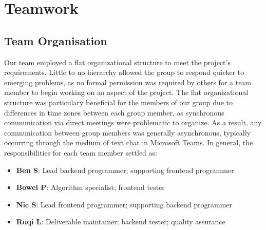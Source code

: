 \documentclass{article}
\begin{document}
\section{Teamwork}
\subsection{Team Organisation}
Our team employed a flat organizational structure to meet the project's
requirements. Little to no hierarchy allowed the group to respond quicker
to emerging problems, as no formal permission was required by others for
a team member to begin working on an aspect of the project. The flat
organizational structure was particulary beneficial for the members of our
group due to differences in time zones between each group member, as
synchronous communication via direct meetings were problematic to organize.
As a result, any communication between group members was generally
asynchronous, typically occurring through the medium of text chat in Microsoft
Teams. In general, the responsibilities for each team member settled as:
\begin{itemize}
\item \textbf{Ben S}: Lead backend programmer; supporting frontend programmer
\item \textbf{Bowei P}: Algorithm specialist; frontend tester
\item \textbf{Nic S}: Lead frontend programmer; supporting backend programmer
\item \textbf{Ruqi L}: Deliverable maintainer; backend tester; quality
assurance
\end{itemize}
\end{document}
